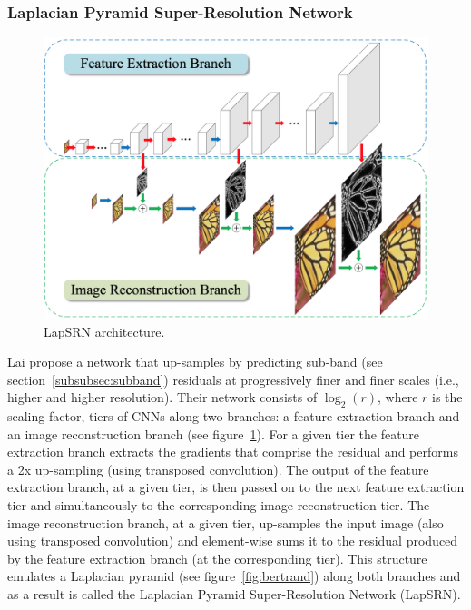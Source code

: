 \subsubsection{Laplacian Pyramid Super-Resolution Network}\label{subsubsec:lapsrn}
\begin{figure}
    \centering
    \begin{adjustbox}{width=\linewidth}
        \centering
        \includegraphics{figures/neural_networks/lapsrn.png}
    \end{adjustbox}
    \caption{LapSRN architecture\cite{Lai_2017}.}\label{fig:lapsrn}
\end{figure}
Lai \etal\cite{Lai_2017} propose a network that up-samples by predicting sub-band (see section~\ref{subsubsec:subband}) residuals at progressively finer and finer scales (i.e., higher and higher resolution).
%
Their network consists of \(\log_2(r)\), where \(r\) is the scaling factor, tiers of CNNs along two branches: a feature extraction branch and an image reconstruction branch (see figure~\ref{fig:lapsrn}).
%
For a given tier the feature extraction branch extracts the gradients that comprise the residual and performs a 2x up-sampling (using transposed convolution). 
%
The output of the feature extraction branch, at a given tier, is then passed on to the next feature extraction tier and simultaneously to the corresponding image reconstruction tier.
%
The image reconstruction branch, at a given tier, up-samples the input image (also using transposed convolution) and element-wise sums it to the residual produced by the feature extraction branch (at the corresponding tier).
%
This structure emulates a Laplacian pyramid (see figure~\ref{fig:bertrand}) along both branches and as a result is called the Laplacian Pyramid Super-Resolution Network (LapSRN).

